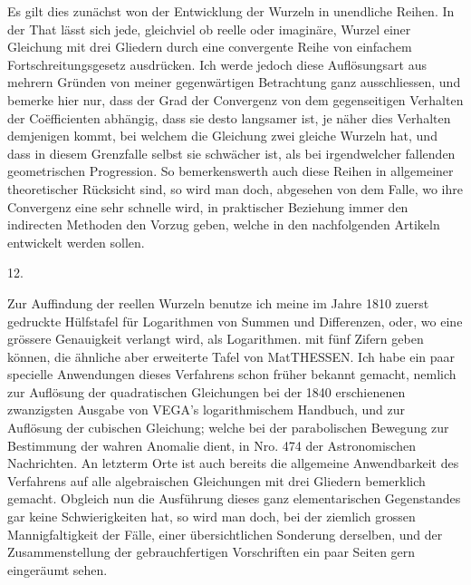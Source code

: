 \documentclass[twoside,12pt, showframe]{memoir}
\begin{document}
Es gilt dies zunächst won der Entwicklung der Wurzeln in unendliche Reihen. In der That lässt sich jede, gleichviel ob reelle oder imaginäre, Wurzel einer Gleichung mit drei Gliedern durch eine convergente Reihe von einfachem Fortschreitungsgesetz ausdrücken. Ich werde jedoch diese Auflösungsart aus mehrern Gründen von meiner gegenwärtigen Betrachtung ganz ausschliessen, und bemerke hier nur, dass der Grad der Convergenz von dem gegenseitigen Verhalten der Coëfficienten abhängig, dass sie desto langsamer ist, je näher dies Verhalten demjenigen kommt, bei welchem die Gleichung zwei gleiche Wurzeln hat, und dass in diesem Grenzfalle selbst sie schwächer ist, als bei irgendwelcher fallenden geometrischen Progression. So bemerkenswerth auch diese Reihen in allgemeiner theoretischer Rücksicht sind, so wird man doch, abgesehen von dem Falle, wo ihre Convergenz eine sehr schnelle wird, in praktischer Beziehung immer den indirecten Methoden den Vorzug geben, welche in den nachfolgenden Artikeln entwickelt werden sollen.

12.

\begin{center}
\end{center}

Zur Auffindung der reellen Wurzeln benutze ich meine im Jahre 1810 zuerst gedruckte Hülfstafel für Logarithmen von Summen und Differenzen, oder, wo eine grössere Genauigkeit verlangt wird, als Logarithmen. mit fünf Zifern geben
können, die ähnliche aber erweiterte Tafel von MatTHESSEN. Ich habe ein paar specielle Anwendungen dieses Verfahrens schon früher bekannt gemacht, nemlich zur Auflösung der quadratischen Gleichungen bei der 1840 erschienenen zwanzigsten Ausgabe von VEGA's logarithmischem Handbuch, und zur Auflösung der cubischen Gleichung; welche bei der parabolischen Bewegung zur Bestimmung der wahren Anomalie dient, in Nro. 474 der Astronomischen Nachrichten. An letzterm Orte ist auch bereits die allgemeine Anwendbarkeit des Verfahrens auf alle algebraischen Gleichungen mit drei Gliedern bemerklich gemacht. Obgleich nun die Ausführung dieses ganz elementarischen Gegenstandes gar keine Schwierigkeiten hat, so wird man doch, bei der ziemlich grossen Mannigfaltigkeit der Fälle, einer übersichtlichen Sonderung derselben, und der Zusammenstellung der gebrauchfertigen Vorschriften ein paar Seiten gern eingeräumt sehen.
\end{document}
